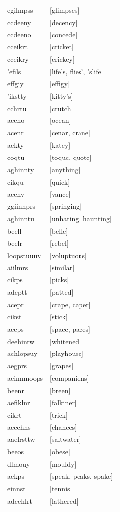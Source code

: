 \documentclass{article}
\begin{document}
\begin{tabular}{ll}
egilmpss & [glimpses] \\
ccdeeny & [decency] \\
ccdeeno & [concede] \\
cceikrt & [cricket] \\
cceikry & [crickey] \\
'efils & [life's, flies', 'slife] \\
effgiy & [effigy] \\
'ikstty & [kitty's] \\
cchrtu & [crutch] \\
aceno & [ocean] \\
acenr & [cenar, crane] \\
aekty & [katey] \\
eoqtu & [toque, quote] \\
aghinnty & [anything] \\
cikqu & [quick] \\
acenv & [vance] \\
ggiinnprs & [springing] \\
aghinntu & [unhating, haunting] \\
beell & [belle] \\
beelr & [rebel] \\
loopstuuuv & [voluptuous] \\
aiilmrs & [similar] \\
cikps & [picks] \\
adeptt & [patted] \\
acepr & [crape, caper] \\
cikst & [stick] \\
aceps & [space, paces] \\
deehintw & [whitened] \\
aehlopsuy & [playhouse] \\
aegprs & [grapes] \\
acimnnoops & [companions] \\
beenr & [breen] \\
aefiklnr & [falkiner] \\
cikrt & [trick] \\
accehns & [chances] \\
aaelrsttw & [saltwater] \\
beeos & [obese] \\
dlmouy & [mouldy] \\
aekps & [speak, peaks, spake] \\
einnst & [tennis] \\
adeehlrt & [lathered] \\

\end{tabular}
\end{document}
